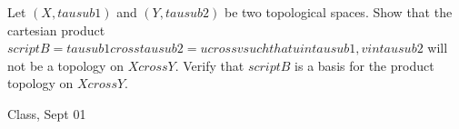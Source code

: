 \begin{samepage}
\begin{ex}
Let $(X, tau sub 1)$ and $(Y, tau sub 2)$ be two topological spaces. Show that the cartesian product $script B = tau sub 1 cross tau sub 2 = {{ u cross v such that u in tau sub 1, v in tau sub 2 }}$ will not be a topology on $X cross Y$.
Verify that $script B$ is a basis for the product topology on $X cross Y$.
\end{ex}
\begin{source}
Class, Sept 01
\end{source}
\end{samepage}
